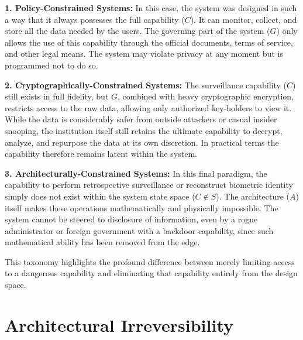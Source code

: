 \documentclass[conference]{IEEEtran}
\begin{document}
\textbf{1. Policy-Constrained Systems:}
In this case, the system was designed in such a way that it always possesses the full capability ($C$). It can monitor, collect, and store all the data needed by the users. The governing part of the system ($G$) only allows the use of this capability through the official documents, terms of service, and other legal means. The system may violate privacy at any moment but is programmed not to do so.

\textbf{2. Cryptographically-Constrained Systems:}
The surveillance capability ($C$) still exists in full fidelity, but $G$, combined with heavy cryptographic encryption, restricts access to the raw data, allowing only authorized key-holders to view it. While the data is considerably safer from outside attackers or casual insider snooping, the institution itself still retains the ultimate capability to decrypt, analyze, and repurpose the data at its own discretion. In practical terms the capability therefore remains latent within the system.

\textbf{3. Architecturally-Constrained Systems:}
In this final paradigm, the capability to perform retrospective surveillance or reconstruct biometric identity simply does not exist within the system state space ($C \notin S$). The architecture ($A$) itself makes these operations mathematically and physically impossible. The system cannot be steered to disclosure of information, even by a rogue administrator or foreign government with a backdoor capability, since such mathematical ability has been removed from the edge.

This taxonomy highlights the profound difference between merely limiting access to a dangerous capability and eliminating that capability entirely from the design space.

\section{Architectural Irreversibility}
\end{document}
